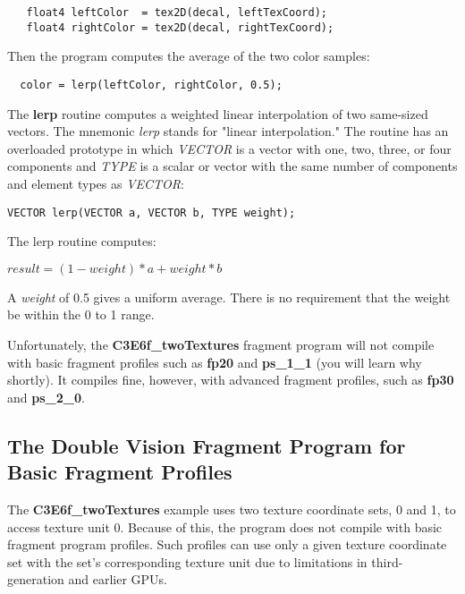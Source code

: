 \documentclass[../main.tex]{subfiles}
\begin{document}
\FloatBarrier
\begin{lstlisting}   
   float4 leftColor  = tex2D(decal, leftTexCoord);
   float4 rightColor = tex2D(decal, rightTexCoord);
\end{lstlisting}
\FloatBarrier

Then the program computes the average of the two color samples:

\FloatBarrier
\begin{lstlisting}
  color = lerp(leftColor, rightColor, 0.5);
\end{lstlisting}
\FloatBarrier

The \textbf{lerp} routine computes a weighted linear interpolation of two same-sized vectors. The mnemonic \textit{lerp} stands for "linear interpolation." The routine has an overloaded prototype in which \textit{VECTOR} is a vector with one, two, three, or four components and \textit{TYPE} is a scalar or vector with the same number of components and element types as \textit{VECTOR}:

\FloatBarrier
\begin{lstlisting}
VECTOR lerp(VECTOR a, VECTOR b, TYPE weight);
\end{lstlisting}
\FloatBarrier

The lerp routine computes:

\FloatBarrier
$
result = (1 - weight) * a + weight * b
$
\FloatBarrier

A \textit{weight} of 0.5 gives a uniform average. There is no requirement that the weight be within the 0 to 1 range.

Unfortunately, the \textbf{C3E6f_twoTextures} fragment program will not compile with basic fragment profiles such as \textbf{fp20} and \textbf{ps_1_1} (you will learn why shortly). It compiles fine, however, with advanced fragment profiles, such as \textbf{fp30} and \textbf{ps_2_0}.

\subsection*{The Double Vision Fragment Program for Basic Fragment Profiles}

The \textbf{C3E6f_twoTextures} example uses two texture coordinate sets, 0 and 1, to access texture unit 0. Because of this, the program does not compile with basic fragment program profiles. Such profiles can use only a given texture coordinate set with the set's corresponding texture unit due to limitations in third-generation and earlier GPUs.
\end{document}
